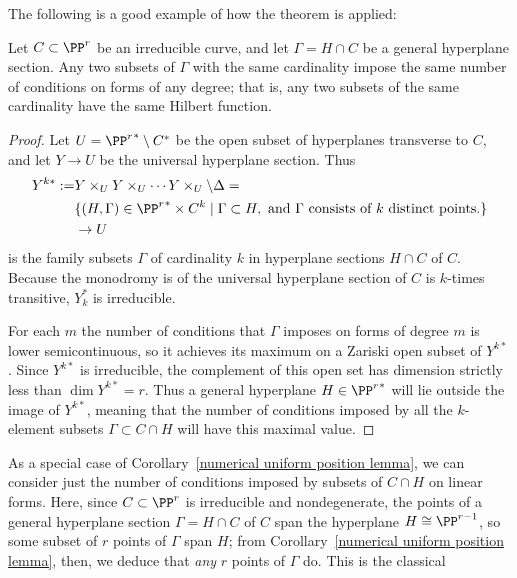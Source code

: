 The following is a good example of how the theorem is applied:

\begin{corollary}\label{numerical uniform position lemma}
Let $C\subset \PP^r$ be an irreducible curve, and let $\Gamma = H\cap C$ be a general hyperplane section. Any two subsets of $\Gamma$ with the same cardinality impose the same number of conditions on forms of any degree; that is, any two subsets of the same cardinality have the same Hilbert function.
\end{corollary}

\begin{proof} Let $U = {\PP^r}^* \setminus C^*$ be the open subset of hyperplanes transverse to $C$, and let $Y\to U$ be the universal hyperplane section.
Thus
\begin{align*}
 Y^{k*} :=&Y\times_U Y\times_U \cdots Y\times_U \setminus \Delta  =\\
                                                 & \{ (H, \Gamma) \in {\PP^r}^* \times C^k \mid \Gamma \subset H, \hbox{ and $\Gamma$ consists of $k$ distinct points.}\}\\
                                                 &\to U
\end{align*}
is the family subsets $\Gamma$ of cardinality $k$ in hyperplane sections $H \cap C$ of $C$. Because the monodromy is of the universal hyperplane section of $C$ is
$k$-times transitive, $Y_k^*$ is irreducible.

For each $m$ the number of conditions that $\Gamma$ imposes on forms of degree $m$ is lower semicontinuous, so it achieves its maximum on a Zariski open subset of $Y^{k*}$. Since $Y^{k*}$ is irreducible, the complement of this open set has dimension strictly less than $\dim Y^{k*} = r$. Thus a general hyperplane $H \in {\PP^r}^*$ will lie outside the image of $Y^{k*}$, meaning that the number of conditions imposed by all the $k$-element subsets $\Gamma \subset C \cap H$ will have this maximal value.

\end{proof}


As a special case of Corollary~\ref{numerical uniform position lemma}, we can consider just the number of conditions imposed by subsets of $C \cap H$ on linear forms. Here, since $C \subset \PP^r$ is irreducible and nondegenerate, the points of a general hyperplane section $\Gamma = H \cap C$ of $C$ span the hyperplane $H \cong \PP^{r-1}$, so some subset of $r$ points of $\Gamma$ span $H$; from Corollary~\ref{numerical uniform position lemma}, then, we deduce that \emph{any} $r$ points of $\Gamma$ do. This is the classical


